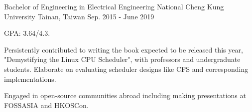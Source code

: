 \begin{cventries}
  \vspace{-3mm}

  \cventry
    {Bachelor of Engineering in Electrical Engineering} %
    {National Cheng Kung University} %
    {Tainan, Taiwan} %
    {Sep. 2015 - June 2019} %
    {
      \begin{cvitems} %
        \item{GPA: 3.64/4.3.}
        \item {Persistently contributed to writing the book expected to be released this year, "Demystifying the Linux CPU Scheduler", with professors and undergraduate students. Elaborate on 
        evaluating scheduler designs like CFS and corresponding implementations.
        }
        \item{Engaged in open-source communities abroad including making presentations at FOSSASIA and HKOSCon.
        }
      \end{cvitems}
    }

\end{cventries}
